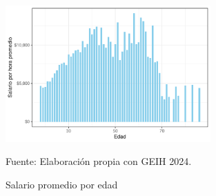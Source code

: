         \begin{figure}[H]
            \caption{Salario promedio por edad}
            \centering
            \includegraphics[width=0.7\textwidth]{imagenes/barras2.pdf}
             \label{fig:barras_sal}
            \begin{minipage}{7\textwidth}
            \footnotesize
            \hspace{4cm} Fuente: Elaboración propia con GEIH 2024.
       
            \end{minipage}
        \end{figure}